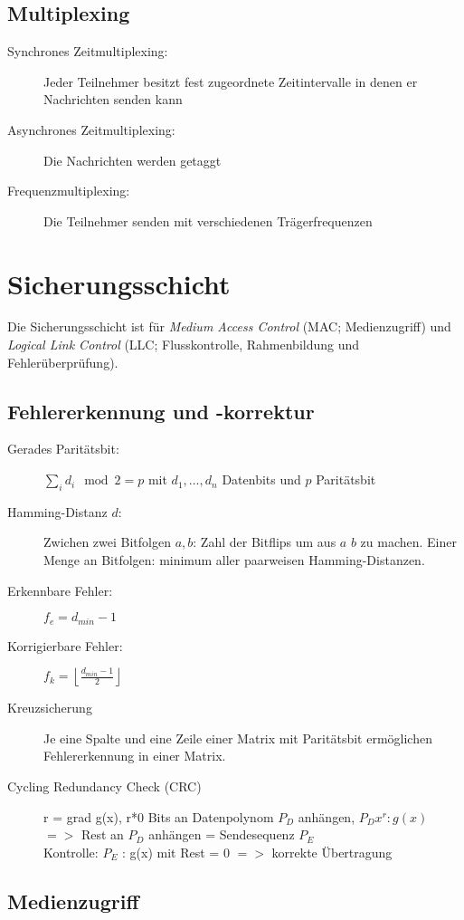 \documentclass[a4paper]{article}
\begin{document}
\subsection{Multiplexing}
\begin{description}
    \item[Synchrones Zeitmultiplexing:] Jeder Teilnehmer besitzt fest zugeordnete Zeitintervalle in denen er Nachrichten senden kann
    \item[Asynchrones Zeitmultiplexing:] Die Nachrichten werden getaggt
    \item[Frequenzmultiplexing:] Die Teilnehmer senden mit verschiedenen Trägerfrequenzen
\end{description}

\section{Sicherungsschicht}
Die Sicherungsschicht ist für \textit{Medium Access Control} (MAC; Medienzugriff) und \textit{Logical Link Control} (LLC; Flusskontrolle, Rahmenbildung und Fehlerüberprüfung).

\subsection{Fehlererkennung und -korrektur}
\begin{description}
    \item[Gerades Paritätsbit:] $\sum_i d_i \mod 2 = p$ mit $d_1, \dots, d_n$ Datenbits und $p$ Paritätsbit
    \item[Hamming-Distanz $d$:] Zwichen zwei Bitfolgen $a, b$: Zahl der Bitflips um aus $a$ $b$ zu machen. Einer Menge an Bitfolgen: minimum aller paarweisen Hamming-Distanzen.
    \item[Erkennbare Fehler:] $f_e = d_{min}-1$
    \item[Korrigierbare Fehler:] $f_k = \left\lfloor \frac{d_{min}-1}{2} \right\rfloor$
    \item[Kreuzsicherung] Je eine Spalte und eine Zeile einer Matrix mit Paritätsbit ermöglichen Fehlererkennung in einer Matrix.
    \item[Cycling Redundancy Check (CRC)] r = grad g(x), r*0 Bits an Datenpolynom $P_D$ anhängen, $P_D x^r : g(x)$ $=>$ Rest an $P_D$ anhängen = Sendesequenz $P_E$ \\Kontrolle: $P_E$ : g(x) mit Rest = 0 $=>$ korrekte Übertragung
\end{description}


\subsection{Medienzugriff}
\end{document}
